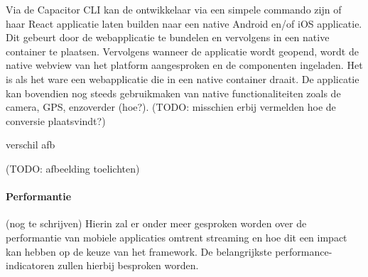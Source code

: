 Via de Capacitor CLI kan de ontwikkelaar via een simpele commando zijn of haar React applicatie laten builden naar een native Android en/of iOS applicatie. Dit gebeurt door de webapplicatie te bundelen en vervolgens in een native container te plaatsen. Vervolgens wanneer de applicatie wordt geopend, wordt de native webview van het platform aangesproken en de 
componenten ingeladen. Het is als het ware een webapplicatie die in een native container draait. De applicatie kan bovendien nog steeds gebruikmaken van native functionaliteiten zoals de camera, GPS, enzoverder (hoe?). (TODO: misschien erbij vermelden hoe de conversie plaatsvindt?)






verschil afb

(TODO: afbeelding toelichten)
\paragraph{Performantie}

(nog te schrijven)
Hierin zal er onder meer gesproken worden over de performantie van mobiele applicaties omtrent streaming en hoe dit een impact kan hebben op de keuze van het framework. De belangrijkste performance-indicatoren zullen hierbij besproken worden.



